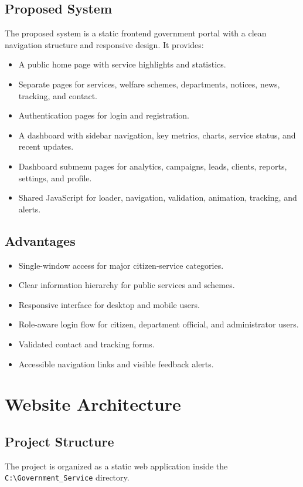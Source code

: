 \documentclass[12pt,a4paper]{report}
\begin{document}
\section{Proposed System}
The proposed system is a static frontend government portal with a clean navigation structure and responsive design. It provides:
\begin{itemize}[leftmargin=0.4in]
    \item A public home page with service highlights and statistics.
    \item Separate pages for services, welfare schemes, departments, notices, news, tracking, and contact.
    \item Authentication pages for login and registration.
    \item A dashboard with sidebar navigation, key metrics, charts, service status, and recent updates.
    \item Dashboard submenu pages for analytics, campaigns, leads, clients, reports, settings, and profile.
    \item Shared JavaScript for loader, navigation, validation, animation, tracking, and alerts.
\end{itemize}

\section{Advantages}
\begin{itemize}[leftmargin=0.4in]
    \item Single-window access for major citizen-service categories.
    \item Clear information hierarchy for public services and schemes.
    \item Responsive interface for desktop and mobile users.
    \item Role-aware login flow for citizen, department official, and administrator users.
    \item Validated contact and tracking forms.
    \item Accessible navigation links and visible feedback alerts.
\end{itemize}

\chapter{Website Architecture}
\section{Project Structure}
The project is organized as a static web application inside the \texttt{C:\textbackslash Government\_Service} directory.
\end{document}
